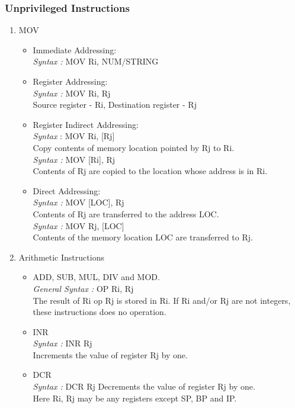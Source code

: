 \documentclass[11pt]{article}
\begin{document}
\subsubsection{Unprivileged Instructions}
\begin{enumerate}
\item MOV
\begin{itemize}
\item Immediate Addressing:\\
\textit{Syntax :} MOV Ri, NUM/STRING
\item Register Addressing:\\
\textit{Syntax :} MOV Ri, Rj\\
Source register - Ri, Destination register - Rj
\item Register Indirect Addressing:\\
\textit{Syntax }: MOV Ri, [Rj]\\
Copy contents of memory location pointed by Rj to Ri.\\
\textit{Syntax :} MOV [Ri], Rj \\
Contents of Rj are copied to the location whose address is in Ri.
\item Direct Addressing:\\
\textit{Syntax :} MOV [LOC], Rj\\
Contents of Rj are transferred to the address LOC.\\
\textit{Syntax :} MOV Rj, [LOC]\\
Contents of the memory location LOC are transferred to Rj.
\end{itemize}


\item Arithmetic Instructions

\begin{itemize}
\item ADD, SUB, MUL, DIV and MOD.\\
\textit{General Syntax :} OP Ri, Rj\\
The result of Ri op Rj is stored in Ri. If Ri and/or Rj are not integers, these instructions does no operation.
\item INR\\
\textit{Syntax :} INR Rj\\
Increments the value of register Rj by one.
\item  DCR\\
\textit{Syntax :} DCR Rj
Decrements the value of register Rj by one.\\
Here Ri, Rj may be any registers except SP, BP and IP.
\end{itemize}



\end{enumerate}
\end{document}
